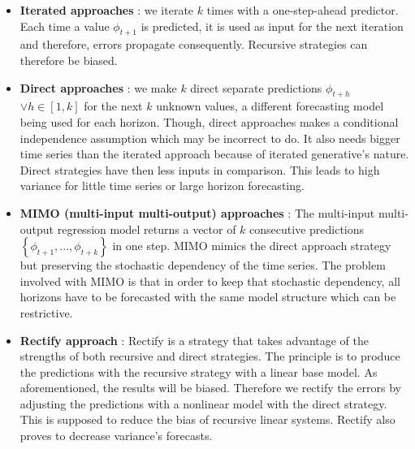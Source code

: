 \documentclass[11pt,a4paper,oneside]{book}
\begin{document}
\begin{itemize}
    \item \textbf{Iterated approaches} : we iterate $k$ times with a one-step-ahead predictor. Each time a value $\phi_{t+1}$ is predicted, it is used as input for the next iteration and therefore, errors propagate consequently. Recursive strategies can therefore be biased.
    \item \textbf{Direct approaches} : we make $k$ direct separate predictions $\phi_{t+h}$ $\vee h \in \left[1, k\right]$ for the next $k$ unknown values, a different forecasting model being used for each horizon. Though, direct approaches makes a conditional independence assumption which may be incorrect to do. It also needs bigger time series than the iterated approach because of iterated generative's nature. Direct strategies have then less inputs in comparison. This leads to high variance for little time series or large horizon forecasting.
    \item \textbf{MIMO (multi-input multi-output) approaches} : The multi-input multi-output regression model returns a vector of $k$ consecutive predictions $\left\{\phi_{t+1},...,\phi_{t+k}\right\}$ in one step. MIMO mimics the direct approach strategy but preserving the stochastic dependency of the time series. The problem involved with MIMO is that in order to keep that stochastic dependency, all horizons have to be forecasted with the same model structure which can be restrictive. \cite{Bonte}\cite{taiebonte}
    \item \textbf{Rectify approach} : Rectify is a strategy that takes advantage of the strengths of both recursive and direct strategies. The principle is to produce the predictions with the recursive strategy with a linear base model. As aforementioned, the results will be biased. Therefore we rectify the errors by adjusting the predictions with a nonlinear model with the direct strategy. This is supposed to reduce the bias of recursive linear systems. Rectify also proves to decrease variance's forecasts. \cite{BenTaieb}
\end{itemize}
\end{document}
